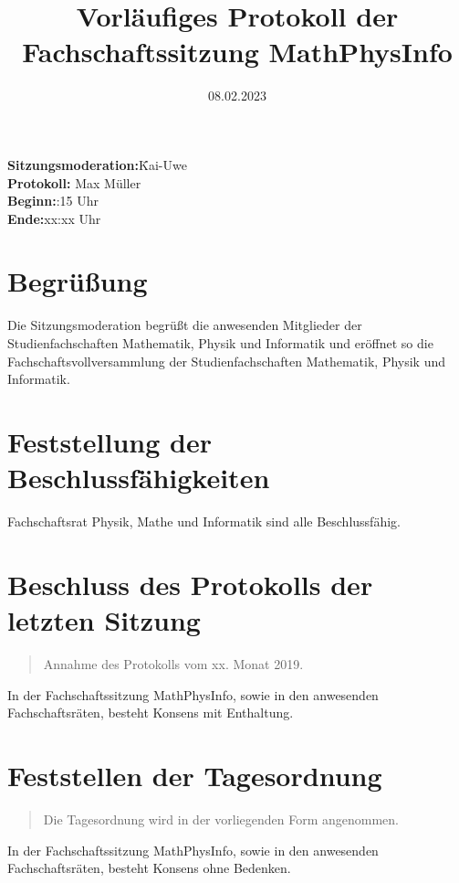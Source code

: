 \documentclass[11pt, fachschaft=mathphys,twosided=true]{mathphys-protocol}
\newenvironment{antrag}{\begin{quote}\begin{itshape}}{\end{itshape}\end{quote}}
\newcommand{\konsens}[1]{In der Fachschaftssitzung MathPhysInfo, sowie in den anwesenden Fachschaftsräten, besteht Konsens ohne Bedenken.\\} %
\newcommand{\konsensE}[1]{In der Fachschaftssitzung MathPhysInfo, sowie in den anwesenden Fachschaftsräten, besteht Konsens mit Enthaltung.\\} %
\newcommand{\simo}{Kai-Uwe}
\newcommand{\tipper}{Max Müller}
\newcommand{\sbegin}{18:15 Uhr}
\newcommand{\sende}{xx:xx Uhr}
\def\datum{08.02.2023}
\begin{document}
\date{\vspace{-2em} \datum \vspace{-1em}} %
\title{\vspace{-2em}Vorläufiges Protokoll der Fachschaftssitzung MathPhysInfo}
\maketitle

\begin{tabbing}
    \textbf{Sitzungsmoderation:}\quad\=\simo \\%
    \textbf{Protokoll:}\> \tipper \\%
    \textbf{Beginn:}\>\sbegin\\
    \textbf{Ende:}\>\sende\\ %
\end{tabbing}

\section{Begrüßung}
    Die Sitzungsmoderation begrüßt die anwesenden Mitglieder der Studienfachschaften Mathematik, Physik und Informatik und eröffnet so die Fachschaftsvollversammlung der Studienfachschaften Mathematik, Physik und Informatik.

\section{Feststellung der Beschlussfähigkeiten}
    Fachschaftsrat Physik, Mathe und Informatik sind alle Beschlussfähig.

\section{Beschluss des Protokolls der letzten Sitzung}

\begin{antrag}
    Annahme des Protokolls vom xx. Monat 2019. \\%
\end{antrag}
\konsensE{}

\section{Feststellen der Tagesordnung}
\begin{antrag}
    Die Tagesordnung wird in der vorliegenden Form angenommen.
\end{antrag}
\konsens{}
\end{document}
